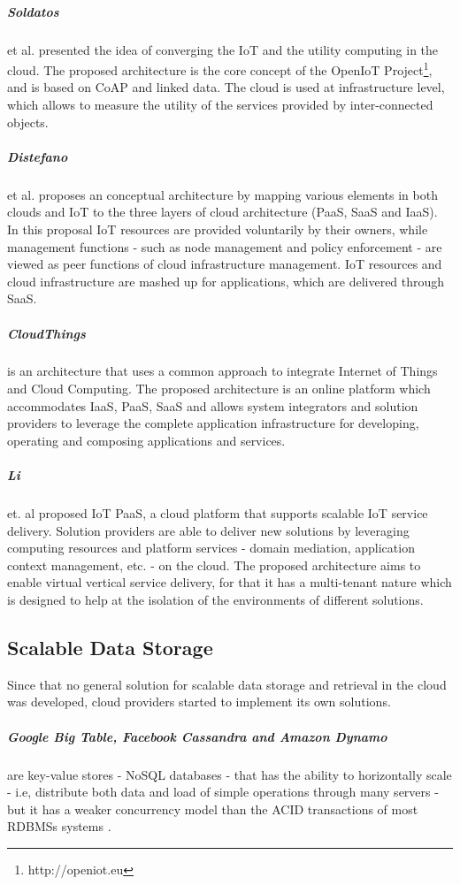 \subparagraph{Soldatos} et al. \cite{soldatos2012convergence} presented the idea of converging the IoT and the utility computing in the
cloud. The proposed architecture is the core concept of the OpenIoT Project\footnote{http://openiot.eu},
and is based on CoAP \cite{shelby2014constrained} and linked data. The cloud is used at infrastructure
level, which allows to measure the utility of the services provided by inter-connected objects.
\subparagraph{Distefano} et al. \cite{distefano2012enabling} proposes an conceptual architecture by mapping various
elements in both clouds and IoT to the three layers of cloud architecture (\gls{PaaS}, \gls{SaaS} and \gls{IaaS}).
In this proposal IoT resources are provided voluntarily by their owners, while management functions
- such as node management and policy enforcement - are viewed as peer functions of cloud infrastructure
management. IoT resources and cloud infrastructure are mashed up for applications, which are delivered
through \gls{SaaS}.
\subparagraph{CloudThings} \cite{zhou2013cloudthings} is an architecture that uses a common
approach to integrate Internet of Things and Cloud Computing. The proposed architecture is an online
platform which accommodates \gls{IaaS}, \gls{PaaS}, \gls{SaaS} and allows system integrators and
solution providers to leverage the complete application infrastructure for developing, operating
and composing applications and services.
\subparagraph{Li} et. al \cite{li2013efficient} proposed IoT PaaS, a cloud platform that supports
scalable IoT service delivery. Solution providers are able to deliver new solutions by leveraging
computing resources and platform services - domain mediation, application context management, etc.
- on the cloud. The proposed architecture aims to enable virtual vertical service delivery, for that
it has a multi-tenant nature which is designed to help at the isolation of the environments of
different solutions.

\subsection{Scalable Data Storage}
\label{sub:data_storage}
Since that no general solution for scalable data storage and retrieval in the cloud was developed,
cloud providers started to implement its own solutions.

\subparagraph{Google Big Table, Facebook Cassandra and  Amazon Dynamo} \cite{chang2008bigtable} \cite{lakshman2010cassandra}
\cite{decandia2007dynamo} are key-value stores - \gls{NoSQL} databases - that has the ability to horizontally scale - i.e,
distribute both data and load of simple operations through many servers - but it has a weaker concurrency model
than the ACID transactions of most \glspl{RDBMS} systems \cite{cattell2011scalable}.


